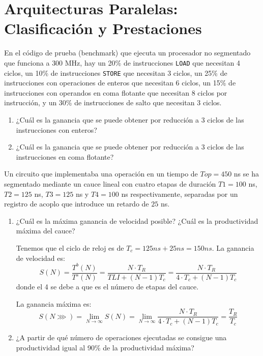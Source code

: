 \section{Arquitecturas Paralelas: Clasificación y Prestaciones}


\begin{ejercicio}
    En el código de prueba (benchmark) que ejecuta un procesador no segmentado que funciona a
    $300$ MHz, hay un 20\% de instrucciones \verb|LOAD| que necesitan 4 ciclos, un 10\% de
    instrucciones \verb|STORE| que necesitan 3 ciclos, un 25\% de instrucciones con operaciones de
    enteros que necesitan 6 ciclos, un 15\% de instrucciones con operandos en coma flotante que
    necesitan 8 ciclos por instrucción, y un 30\% de instrucciones de salto que necesitan 3 ciclos.
    \begin{enumerate}
        \item ¿Cuál es la ganancia que se puede obtener por reducción a 3 ciclos de las instrucciones
        con enteros?
        \item ¿Cuál es la ganancia que se puede obtener por reducción a 3 ciclos de las instrucciones
        en coma flotante?
    \end{enumerate}
\end{ejercicio}

\begin{ejercicio}
    Un circuito que implementaba una operación en un tiempo de $Top=450$ ns se ha segmentado
    mediante un cauce lineal con cuatro etapas de duración $T1=100$ ns, $T2=125$ ns, $T3=125$ ns y
    $T4=100$ ns respectivamente, separadas por un registro de acoplo que introduce un retardo de
    $25$ ns.
    \begin{enumerate}
        \item ¿Cuál es la máxima ganancia de velocidad posible? ¿Cuál es la productividad máxima
        del cauce?

        Tenemos que el ciclo de reloj es de $T_c = 125ns + 25ns = 150ns$. La ganancia de velocidad es:
        $$
        S(N) = \frac{T^b(N)}{T^s(N)} = \frac{N\cdot T_R}{TLI + (N-1)T_c}
        = \frac{N\cdot T_R}{4\cdot T_c + (N-1)T_c}
        $$
        donde el 4 se debe a que es el número de etapas del cauce.

        La ganancia máxima es:
        $$
        S(N\ggg) = \lim_{N\to\infty} S(N) = \lim_{N\to\infty} \frac{N\cdot T_R}{4\cdot T_c + (N-1)T_c} = \frac{T_R}{T_c}
        $$

        \item ¿A partir de qué número de operaciones ejecutadas se consigue una productividad igual
        al 90\% de la productividad máxima?
    \end{enumerate}
\end{ejercicio}


